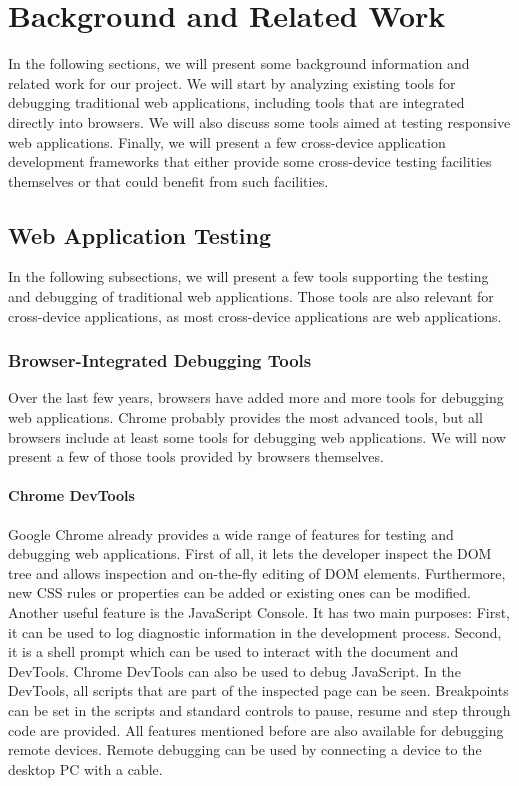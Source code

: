 \chapter{Background and Related Work}

In the following sections, we will present some background information and related work for our project. We will start by analyzing existing tools for debugging traditional web applications, including tools that are integrated directly into browsers. We will also discuss some tools aimed at testing responsive web applications. Finally, we will present a few cross-device application development frameworks that either provide some cross-device testing facilities themselves or that could benefit from such facilities.

\section{Web Application Testing}

In the following subsections, we will present a few tools supporting the testing and debugging of traditional web applications. Those tools are also relevant for cross-device applications, as most cross-device applications are web applications.

\subsection{Browser-Integrated Debugging Tools}

Over the last few years, browsers have added more and more tools for debugging web applications. Chrome probably provides the most advanced tools, but all browsers include at least some tools for debugging web applications. We will now present a few of those tools provided by browsers themselves.

\subsubsection{Chrome DevTools}

Google Chrome already provides a wide range of features for testing and debugging web applications. First of all, it lets the developer inspect the DOM tree  and allows inspection and on-the-fly editing of DOM elements. Furthermore, new CSS rules or properties can be added or existing ones can be modified. Another useful feature is the JavaScript Console. It has two main purposes: First, it can be used to log diagnostic information in the development process. Second, it is a shell prompt which can be used to interact with the document and DevTools. Chrome DevTools can also be used to debug JavaScript. In the DevTools, all scripts that are part of the inspected page can be seen. Breakpoints can be set in the scripts and standard controls to pause, resume and step through code are provided. All features mentioned before are also available for debugging remote devices. Remote debugging can be used by connecting a device to the desktop PC with a cable.

